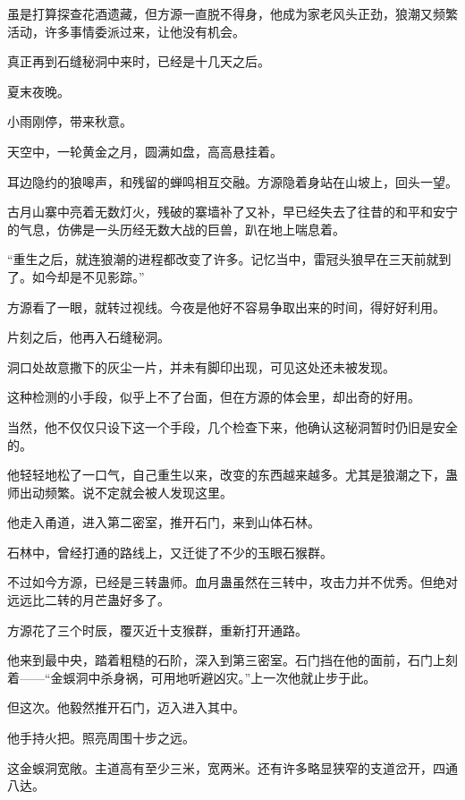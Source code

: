 
\begin{this_body}

虽是打算探查花酒遗藏，但方源一直脱不得身，他成为家老风头正劲，狼潮又频繁活动，许多事情委派过来，让他没有机会。

真正再到石缝秘洞中来时，已经是十几天之后。

夏末夜晚。

小雨刚停，带来秋意。

天空中，一轮黄金之月，圆满如盘，高高悬挂着。

耳边隐约的狼嗥声，和残留的蝉鸣相互交融。方源隐着身站在山坡上，回头一望。

古月山寨中亮着无数灯火，残破的寨墙补了又补，早已经失去了往昔的和平和安宁的气息，仿佛是一头历经无数大战的巨兽，趴在地上喘息着。

“重生之后，就连狼潮的进程都改变了许多。记忆当中，雷冠头狼早在三天前就到了。如今却是不见影踪。”

方源看了一眼，就转过视线。今夜是他好不容易争取出来的时间，得好好利用。

片刻之后，他再入石缝秘洞。

洞口处故意撒下的灰尘一片，并未有脚印出现，可见这处还未被发现。

这种检测的小手段，似乎上不了台面，但在方源的体会里，却出奇的好用。

当然，他不仅仅只设下这一个手段，几个检查下来，他确认这秘洞暂时仍旧是安全的。

他轻轻地松了一口气，自己重生以来，改变的东西越来越多。尤其是狼潮之下，蛊师出动频繁。说不定就会被人发现这里。

他走入甬道，进入第二密室，推开石门，来到山体石林。

石林中，曾经打通的路线上，又迁徙了不少的玉眼石猴群。

不过如今方源，已经是三转蛊师。血月蛊虽然在三转中，攻击力并不优秀。但绝对远远比二转的月芒蛊好多了。

方源花了三个时辰，覆灭近十支猴群，重新打开通路。

他来到最中央，踏着粗糙的石阶，深入到第三密室。石门挡在他的面前，石门上刻着——“金蜈洞中杀身祸，可用地听避凶灾。”上一次他就止步于此。

但这次。他毅然推开石门，迈入进入其中。

他手持火把。照亮周围十步之远。

这金蜈洞宽敞。主道高有至少三米，宽两米。还有许多略显狭窄的支道岔开，四通八达。


\end{this_body}
